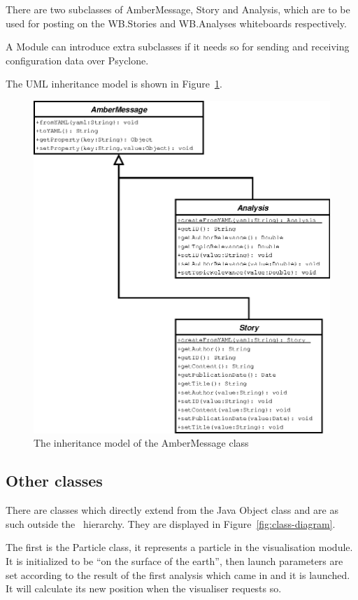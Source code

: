 There are two subclasses of AmberMessage, Story and Analysis, which are to be
used for posting on the WB.Stories and WB.Analyses whiteboards respectively.

A Module can introduce extra subclasses if it needs so for sending and
receiving configuration data over Psyclone.

The UML inheritance model is shown in
Figure~\ref{fig:class-diagram-ambermessage}.

\begin{figure}[htp]
  \centering
  \includegraphics{image/class-diagram-ambermessage}
  \caption{
    \label{fig:class-diagram-ambermessage}
    The inheritance model of the AmberMessage class}
\end{figure}

\subsection{Other classes}

There are classes which directly extend from the Java Object class and are as
such outside the \Amber\ hierarchy. They are displayed in
Figure~\ref{fig:class-diagram}.

The first is the Particle class, it represents a particle in the visualisation
module. It is initialized to be ``on the surface of the earth'', then launch
parameters are set according to the result of the first analysis which came in
and it is launched. It will calculate its new position when the visualiser
requests so.

